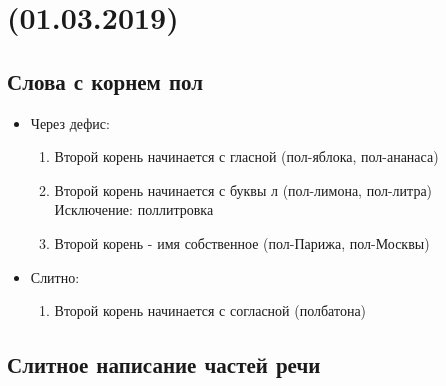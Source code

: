 \documentclass{article}
\begin{document}
\newpage
\noindent\makebox[\linewidth]{\rule{\paperwidth}{0.4pt}}
\section{(01.03.2019)}
\noindent\makebox[\linewidth]{\rule{\paperwidth}{0.4pt}}

\subsection{Слова с корнем пол}
\begin{itemize}
\item
  Через дефис:
  \begin{enumerate}
  \item
    Второй корень начинается с гласной (пол-яблока, пол-ананаса)
  \item
    Второй корень начинается с буквы л (пол-лимона, пол-литра)
    Исключение: поллитровка
  \item
    Второй корень - имя собственное (пол-Парижа, пол-Москвы)
  \end{enumerate}
\item
  Слитно:
  \begin{enumerate}
  \item
    Второй корень начинается с согласной (полбатона)
  \end{enumerate}
\end{itemize}

\subsection{Слитное написание частей речи}
\end{document}
